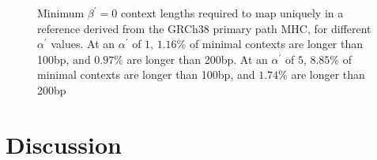 \begin{figure}[t]
  \centering
  \caption{Minimum $\beta^\prime = 0$ context lengths required to map uniquely in a reference derived from the GRCh38 primary path MHC, for different $\alpha^\prime$ values. At an $\alpha^\prime$ of $1$, $1.16\%$ of minimal contexts are longer than 100bp, and $0.97\%$ are longer than 200bp. At an $\alpha^\prime$ of $5$, $8.85\%$ of minimal contexts are longer than 100bp, and $1.74\%$ are longer than 200bp}
  \label{fig:contexts}
\end{figure}

\section{Discussion}


